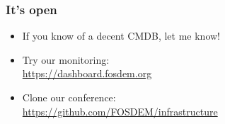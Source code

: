 \documentclass[t]{beamer}
\begin{document}
\begin{frame}
	\frametitle{It's open}
	\vfill
	\begin{itemize}
		\item If you know of a decent CMDB, let me know!
		\item Try our monitoring: \\ \url{https://dashboard.fosdem.org}
		\item Clone our conference: \\ \url{https://github.com/FOSDEM/infrastructure}
	\end{itemize}
	\vfill
\end{frame}
\end{document}
